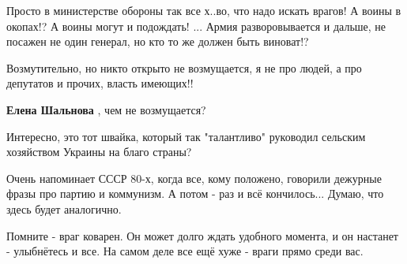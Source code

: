 \begin{itemize}
Просто в министерстве обороны так все х..во, что надо искать врагов! А воины в
окопах!? А воины могут и подождать! ... Армия разворовывается и дальше, не
посажен не один генерал, но кто то же должен быть виноват!?


 

Возмутительно, но никто открыто не возмущается, я не про людей, а про депутатов
и прочих, власть имеющих!!

\begin{itemize}
 
\textbf{Елена Шальнова} , чем не возмущается?
\end{itemize}

 
Интересно, это тот швайка, который так "талантливо" руководил сельским хозяйством Украины на благо страны?

 
Очень напоминает СССР 80-х, когда все, кому положено, говорили дежурные фразы про партию и коммунизм.
А потом - раз и всё кончилось...
Думаю, что здесь будет аналогично.

 
Помните - враг коварен. Он может долго ждать удобного момента, и он настанет - улыбнётесь и все. На самом деле все ещё хуже - враги прямо среди вас.


\end{itemize}
